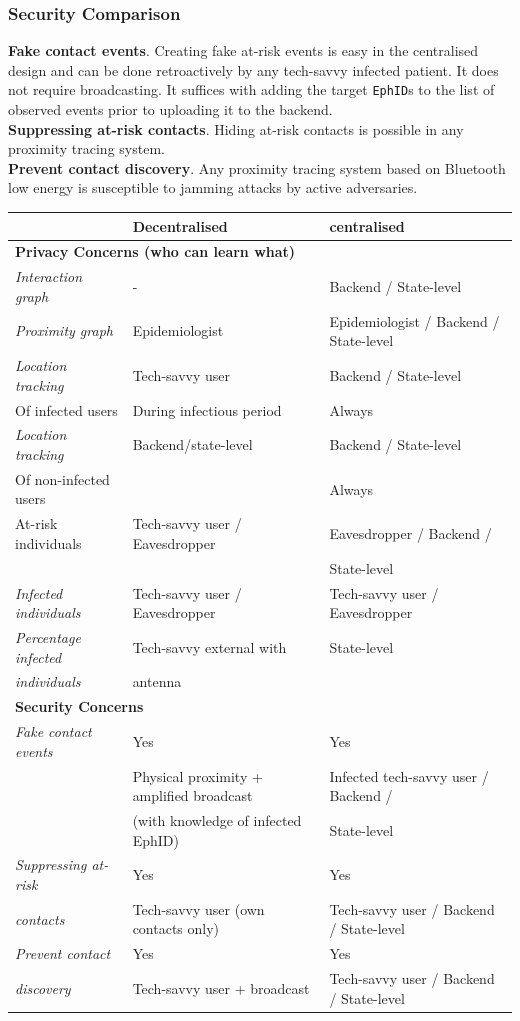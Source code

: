 \documentclass[12pt,a4paper]{article}
\begin{document}
\subsubsection*{Security Comparison}
\textbf{Fake contact events}. Creating fake at-risk events is easy in the centralised design and can be done retroactively by any tech-savvy infected patient. It does not require broadcasting. It suffices with adding the target \texttt{EphID}s to the list of observed events prior to uploading it to the backend.\\[0.3cm]
\textbf{Suppressing at-risk contacts}. Hiding at-risk contacts is possible in any proximity tracing system.\\[0.3cm]
\textbf{Prevent contact discovery}. Any proximity tracing system based on Bluetooth low energy is susceptible to jamming attacks by active adversaries.
\begin{table}[H]
\centering
\begin{tabular}{p{4cm}p{5cm}p{5cm}}\hline
 & \textbf{Decentralised} & \textbf{centralised}\\ \hline
 \multicolumn{3}{l}{\textbf{Privacy Concerns (who can learn what)}}\\
 \textit{Interaction graph} & - & Backend / State-level \\
 \textit{Proximity graph} & Epidemiologist & Epidemiologist / Backend / State-level\\
\textit{Location tracking} & Tech-savvy user & Backend / State-level\\
\small Of infected users & \small During infectious period & Always \small \\
\textit{Location tracking} & Backend/state-level & Backend / State-level\\
\small Of non-infected users & & \small Always\\
At-risk individuals & Tech-savvy user / Eavesdropper & Eavesdropper / Backend /\\
 & & State-level\\
\textit{Infected individuals} & Tech-savvy user / Eavesdropper & Tech-savvy user / Eavesdropper\\
\textit{Percentage infected} & Tech-savvy external with & State-level\\
\textit{individuals} & antenna & \\ \hline
\multicolumn{3}{l}{\textbf{Security Concerns}}\\
\textit{Fake contact events} & Yes & Yes \\
 & \small Physical proximity + amplified broadcast & \small Infected tech-savvy user / Backend /\\
 & \small (with knowledge of infected EphID) & \small State-level\\
\textit{Suppressing at-risk} & Yes & Yes \\
\textit{contacts} & \small Tech-savvy user (own contacts only) & Tech-savvy user / Backend / State-level\\
\textit{Prevent contact} & Yes & Yes \\
\textit{discovery} & \small Tech-savvy user + broadcast & \small Tech-savvy user / Backend / State-level\\ \hline
\end{tabular}
\end{table}
\clearpage
\end{document}
